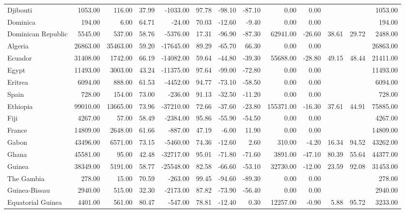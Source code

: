 \begin{table}[ht]
\begin{tabular}{lrrrrrrrrrrrr}
  Djibouti & 1053.00 & 116.00 & 37.99 & -1033.00 & 97.78 & -98.10 & -87.10 & 0.00 & 0.00 &  &  & 1053.00 \\ 
  Dominica & 194.00 & 6.00 & 64.71 & -24.00 & 70.03 & -12.60 & -9.40 & 0.00 & 0.00 &  &  & 194.00 \\ 
  Dominican Republic & 5545.00 & 537.00 & 58.76 & -5376.00 & 17.31 & -96.90 & -87.30 & 62941.00 & -26.60 & 38.61 & 29.72 & 2488.00 \\ 
  Algeria & 26863.00 & 35463.00 & 59.20 & -17645.00 & 89.29 & -65.70 & 66.30 & 0.00 & 0.00 &  &  & 26863.00 \\ 
  Ecuador & 31408.00 & 1742.00 & 66.19 & -14082.00 & 59.64 & -44.80 & -39.30 & 55688.00 & -28.80 & 49.15 & 48.44 & 21411.00 \\ 
  Egypt & 11493.00 & 3003.00 & 43.24 & -11375.00 & 97.64 & -99.00 & -72.80 & 0.00 & 0.00 &  &  & 11493.00 \\ 
  Eritrea & 6094.00 & 888.00 & 61.53 & -4452.00 & 94.77 & -73.10 & -58.50 & 0.00 & 0.00 &  &  & 6094.00 \\ 
  Spain & 728.00 & 154.00 & 73.00 & -236.00 & 91.13 & -32.50 & -11.20 & 0.00 & 0.00 &  &  & 728.00 \\ 
  Ethiopia & 99010.00 & 13665.00 & 73.96 & -37210.00 & 72.66 & -37.60 & -23.80 & 155371.00 & -16.30 & 37.61 & 44.91 & 75885.00 \\ 
  Fiji & 4267.00 & 57.00 & 58.49 & -2384.00 & 95.86 & -55.90 & -54.50 & 0.00 & 0.00 &  &  & 4267.00 \\ 
  France & 14809.00 & 2648.00 & 61.66 & -887.00 & 47.19 & -6.00 & 11.90 & 0.00 & 0.00 &  &  & 14809.00 \\ 
  Gabon & 43496.00 & 6571.00 & 73.15 & -5460.00 & 74.36 & -12.60 & 2.60 & 310.00 & -4.20 & 16.34 & 94.52 & 43262.00 \\ 
  Ghana & 45581.00 & 95.00 & 42.48 & -32717.00 & 95.01 & -71.80 & -71.60 & 3891.00 & -47.10 & 80.39 & 55.64 & 44377.00 \\ 
  Guinea & 38349.00 & 5191.00 & 58.77 & -25548.00 & 82.58 & -66.60 & -53.10 & 32730.00 & -12.00 & 23.59 & 92.08 & 31453.00 \\ 
  The Gambia & 278.00 & 15.00 & 70.59 & -263.00 & 99.45 & -94.60 & -89.30 & 0.00 & 0.00 &  &  & 278.00 \\ 
  Guinea-Bissau & 2940.00 & 515.00 & 32.30 & -2173.00 & 87.82 & -73.90 & -56.40 & 0.00 & 0.00 &  &  & 2940.00 \\ 
  Equatorial Guinea & 4401.00 & 561.00 & 80.47 & -547.00 & 78.81 & -12.40 & 0.30 & 12257.00 & -0.90 & 5.88 & 95.72 & 3233.00 \\ 

\end{tabular}
\end{table}
